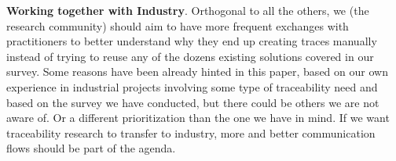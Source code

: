 \textbf{Working together with Industry}. Orthogonal to all the others, we (the research community) should aim to have more frequent exchanges with practitioners to better understand why they end up creating traces manually instead of trying to reuse any of the dozens existing solutions covered in our survey. Some reasons have been already hinted in this paper, based on our own experience in industrial projects involving some type of traceability need and based on the survey we have conducted,  but there could be others we are not aware of. Or a different prioritization than the one we have in mind. If we want traceability research to transfer to industry, more and better communication flows should be part of the agenda. 







